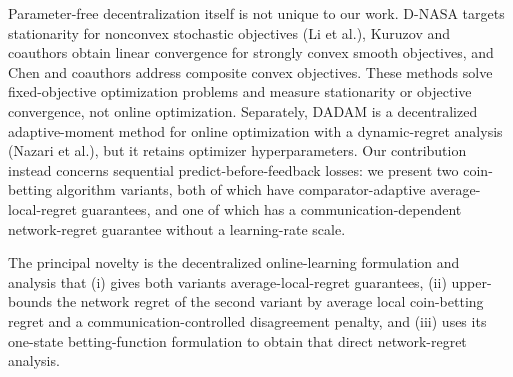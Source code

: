\documentclass[12pt,english]{reviewresponse}
\begin{document}
\begin{revresponse}
\begin{changes}
        Parameter-free decentralization itself is not unique to our work.
        D-NASA targets stationarity for nonconvex stochastic objectives (Li et al.), Kuruzov and coauthors obtain linear convergence for strongly convex smooth objectives, and Chen and coauthors address composite convex objectives.
        These methods solve fixed-objective optimization problems and measure stationarity or objective convergence, not online optimization.
        Separately, DADAM is a decentralized adaptive-moment method for online optimization with a dynamic-regret analysis (Nazari et al.), but it retains optimizer hyperparameters.
        Our contribution instead concerns sequential predict-before-feedback losses: we present two coin-betting algorithm variants, both of which have comparator-adaptive average-local-regret guarantees, and one of which has a communication-dependent network-regret guarantee without a learning-rate scale.

        The principal novelty is the decentralized online-learning formulation and analysis that (i) gives both variants average-local-regret guarantees, (ii) upper-bounds the network regret of the second variant by average local coin-betting regret and a communication-controlled disagreement penalty, and (iii) uses its one-state betting-function formulation to obtain that direct network-regret analysis.
    \end{changes}
\end{revresponse}
\end{document}
